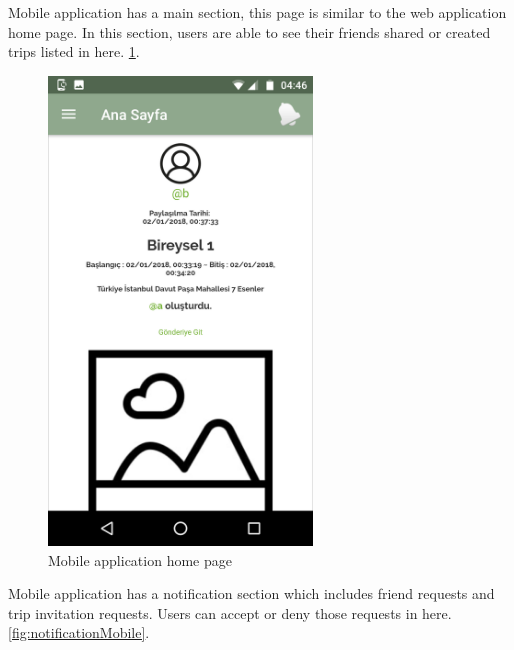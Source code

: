 \newpage

Mobile application has a main section, this page is similar to the web application home page. In this section, users are able to see their friends shared or created trips listed in here.  
\ref{fig:phoneHome}.

\begin{figure}[!htbp]
\centering
\includegraphics[width=70mm,scale=0.7]{projectChapters/images/phoneHome.png}
\caption{Mobile application home page}
\label{fig:phoneHome}
\end{figure}

\newpage

Mobile application has a notification section which includes friend requests and trip invitation requests. Users can accept or deny those requests in here.
\ref{fig:notificationMobile}.

